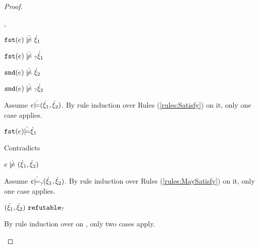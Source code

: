 \begin{proof}
\begin{byCases}
\begin{byCases}
\begin{byCases}
        \item[\cnotsatisfyormay{\hfst{e}}{\hxi_1},\cnotsatisfyormay{\hsnd{e}}{\hxi_2}]
            \begin{pfsteps*}
            \item $\cnotsatisfy{\hfst{e}}{\hxi_1}$  
            \item $\cnotmaysatisfy{\hfst{e}}{\hxi_1}$  
            \item $\cnotsatisfy{\hsnd{e}}{\hxi_2}$  
            \item $\cnotmaysatisfy{\hsnd{e}}{\hxi_2}$  
            \end{pfsteps*}
            Assume $e \dot{\models} (\dot{\xi}_1 , \dot{\xi}_2)$. By rule induction over Rules (\ref{rules:Satisfy}) on it, only one case applies.
            \begin{byCases}
            \item[\text{(\ref{rule:CSNotIntroPair})}]
                \begin{pfsteps*}
                \item $\mathtt{fst}(e) \dot{\models} \dot{\xi}_1$ 
                \end{pfsteps*}
                Contradicts 
            \end{byCases}
            \begin{pfsteps*}
            \item $\cnotsatisfy{e}{\cpair{\hxi_1}{\hxi_2}}$  
            \end{pfsteps*}
            Assume $e \dot{\models}_{?} (\dot{\xi}_1 , \dot{\xi}_2)$. By rule induction over Rules (\ref{rules:MaySatisfy}) on it, only one case applies.
            \begin{byCases}
            \item[\text{(\ref{rule:CMSNotIntro})}]
                \begin{pfsteps*}
                \item $(\dot{\xi}_1 , \dot{\xi}_2) ~\mathtt{refutable}_?$  
                \end{pfsteps*}
                By rule induction over  on , only two cases apply.
                \begin{byCases}

\end{byCases}
\end{byCases}
\end{byCases}
\end{byCases}
\end{byCases}
\end{proof}
